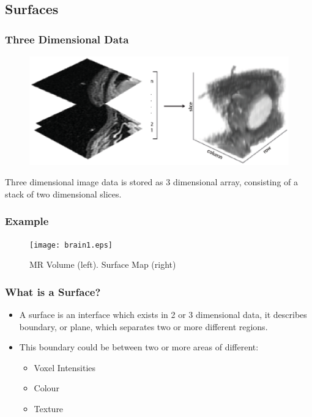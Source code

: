 \documentclass[9pt]{beamer}
\begin{document}
\subsection{Surfaces} 
\begin{frame}[shrink]
	\frametitle{Three Dimensional Data}
	\begin{figure}
		\includegraphics[scale=0.5]{slices.eps}
	\end{figure}
	Three dimensional image data is stored as 3 dimensional array, consisting of a stack of two dimensional slices.
\end{frame}
\begin{frame}
	\frametitle{Example}
	\begin{figure}
	\texttt{[image: brain1.eps]}
	\caption{MR Volume (left). Surface Map (right)}
	\end{figure}
\end{frame}
\begin{frame}
	\frametitle{What is a Surface?}
		\begin{itemize}
				\item A surface is an interface which exists in 2 or 3 dimensional data, it describes boundary, or plane, which separates two or more different regions.\\
				\item This boundary could be between two or more areas of different:
				\begin{itemize}
						\item Voxel Intensities
						\item Colour
						\item Texture
				\end{itemize}
		\end{itemize}
\end{frame}
\end{document}
